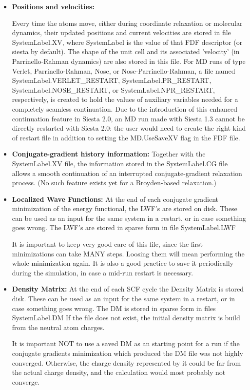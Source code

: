 \documentclass[11pt]{article}
\begin{document}
\begin{itemize}
\item {\bf Positions and velocities:}

Every time the atoms move, either during coordinate relaxation or
molecular dynamics, their updated positions and current velocities are
stored in file SystemLabel.XV, where SystemLabel is the value of that
FDF descriptor (or siesta by default).  The shape of the unit cell and
its associated 'velocity' (in Parrinello-Rahman dynamics) are also
stored in this file. For MD runs of type Verlet, Parrinello-Rahman,
Nose, or Nose-Parrinello-Rahman, a file named
SystemLabel.VERLET\_RESTART, SystemLabel.PR\_RESTART,
SystemLabel.NOSE\_RESTART, or SystemLabel.NPR\_RESTART, respectively, is
created to hold the values of auxiliary variables needed for a
completely seamless continuation. Due to the introduction of this
enhanced continuation feature in Siesta 2.0, an MD run made with
Siesta 1.3 cannot be directly restarted with Siesta 2.0: the user
would need to create the right kind of restart file in addition to
setting the MD.UseSaveXV flag in the FDF file. 


\item {\bf Conjugate-gradient history information:}
Together with the SystemLabel.XV file, the information
stored in the SystemLabel.CG file allows a smooth
continuation of an interrupted conjugate-gradient relaxation
process. (No such feature exists yet for a Broyden-based relaxation.)

\item {\bf Localized Wave Functions:} 
At the end of each conjugate gradient
minimization of the energy functional, the LWF's are
stored on disk. These can be used as an input for
the same system in a restart, or in case something goes
wrong.  The LWF's are stored in sparse form in
file SystemLabel.LWF

It is important to keep very good care of this file,
since the first minimizations can take MANY
steps. Loosing them will mean performing the 
whole minimization again. It is also a good practice 
to save it periodically during the
simulation, in case a mid-run restart is necessary.

\item {\bf Density Matrix:} At the end of each SCF cycle
the Density Matrix is stored
disk. These can be used as an input for
the same system in a restart, or in case something goes
wrong.  The DM is stored in sparse form in files
SystemLabel.DM
If the file does not exist, the initial density
matrix is build from the neutral atom charges.

It is important NOT to use a saved DM as an starting
point for a run if the conjugate gradients minimization
which produced the DM file was not highly converged.
Otherwise, the charge density represented by it
could be far from the actual charge density, and
the calculation would most probably not converge.
\end{itemize}
\end{document}
